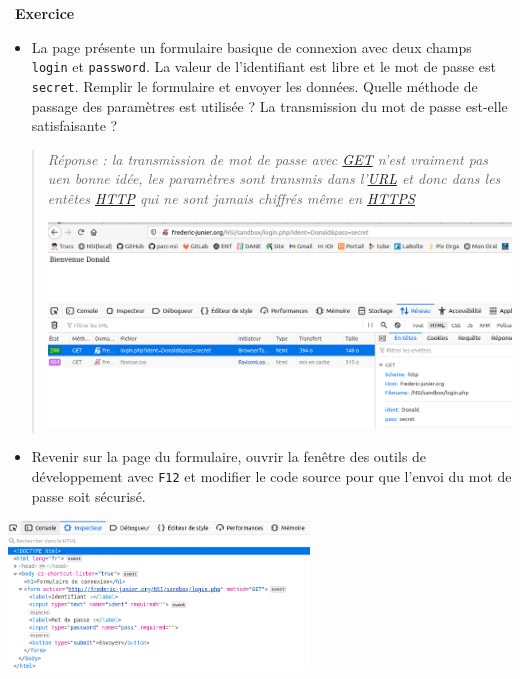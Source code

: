 \documentclass[
  11pt,
]{article}
\newcommand{\passthrough}[1]{#1}
\providecommand{\tightlist}{%
  \setlength{\itemsep}{0pt}\setlength{\parskip}{0pt}}
\newcounter{exo}
\newenvironment{exercice}[1]
{\par \medskip   \addtocounter{exo}{1} \noindent  
\begin{bclogo}[arrondi =0.1,   noborder = true, logo=\bccrayon, marge=4]{~\textbf{Exercice} \textbf{\theexo} {\itshape #1} }  \par}
{
\end{bclogo}
 \par \bigskip }
\newcounter{logi}
\begin{document}
\begin{exercice}{}
\begin{enumerate}
  \begin{itemize}
  \tightlist
  \item
    La page présente un formulaire basique de connexion avec deux champs
    \passthrough{\lstinline!login!} et
    \passthrough{\lstinline!password!}. La valeur de l'identifiant est
    libre et le mot de passe est \passthrough{\lstinline!secret!}.
    Remplir le formulaire et envoyer les données. Quelle méthode de
    passage des paramètres est utilisée ? La transmission du mot de
    passe est-elle satisfaisante ?
  \end{itemize}
\end{enumerate}

\begin{quote}
\emph{Réponse : la transmission de mot de passe avec \url{GET} n'est
vraiment pas uen bonne idée, les paramètres sont transmis dans
l'\url{URL} et donc dans les entêtes \url{HTTP} qui ne sont jamais
chiffrés même en \url{HTTPS}}

\includegraphics{images/login_get.png}\\
\end{quote}

\begin{itemize}
\tightlist
\item
  Revenir sur la page du formulaire, ouvrir la fenêtre des outils de
  développement avec \passthrough{\lstinline!F12!} et modifier le code
  source pour que l'envoi du mot de passe soit sécurisé.
\end{itemize}

\includegraphics[width=0.6\textwidth,height=\textheight]{images/login.png}\\


\end{exercice}
\end{document}
